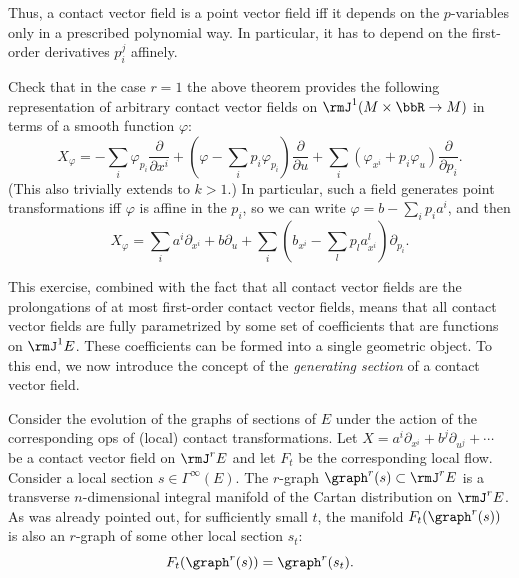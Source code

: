Thus, a contact vector field is a point vector field iff it depends on the $p$-variables only in a prescribed polynomial way. In particular, it has to depend on the first-order derivatives $p^j_i$ affinely.

\begin{xca}
    Check that in the case $r=1$ the above theorem provides the following representation of arbitrary contact vector fields on $\rmJ^1(M\times\bbR\to M)$ in terms of a smooth function $\varphi$:
    \[X_\varphi=-\sum_i \varphi_{p_i}\frac{\partial}{\partial x^i}+\left(\varphi-\sum_i p_i \varphi_{p_i}\right)\frac{\partial}{\partial u}+\sum_i \left(\varphi_{x^i}+p_i\varphi_u\right)\frac{\partial}{\partial p_i}.\label{eq Xf}\]
    (This also trivially extends to $k>1$.) In particular, such a field generates point transformations iff $\varphi$ is affine in the $p_i$, so we can write $\varphi=b-\sum_i p_ia^i$, and then 
    \[X_\varphi=\sum_i a^i\partial_{x^i}+b\partial_u+\sum_i\left(b_{x^i}-\sum_l p_l a^l_{x^i}\right)\partial_{p_i}.\]
\end{xca}

This exercise, combined with the fact that all contact vector fields are the prolongations of at most first-order contact vector fields, means that all contact vector fields are fully parametrized by some set of coefficients that are functions on $\rmJ^1E$. These coefficients can be formed into a single geometric object. To this end, we now introduce the concept of the \emph{generating section} of a contact vector field. 

Consider the evolution of the graphs of sections of $E$ under the action of the corresponding \gls{ops} of (local) contact transformations. Let $X=a^i\partial_{x^i}+b^j\partial_{u^j}+\cdots $ be a contact vector field on $\rmJ^r E$ and let $F_t$ be the corresponding local flow. Consider a local section $s\in\Gamma^\infty(E)$. The $r$-graph $\graph^r(s)\subset \rmJ^rE$ is a transverse $n$-dimensional integral manifold of the Cartan distribution on $\rmJ^rE$. As was already pointed out, for sufficiently small $t$, the manifold $F_t(\graph^r(s))$ is also an $r$-graph of some other local section $s_t$:
\[F_t(\graph^r(s))=\graph^r(s_t).\]

